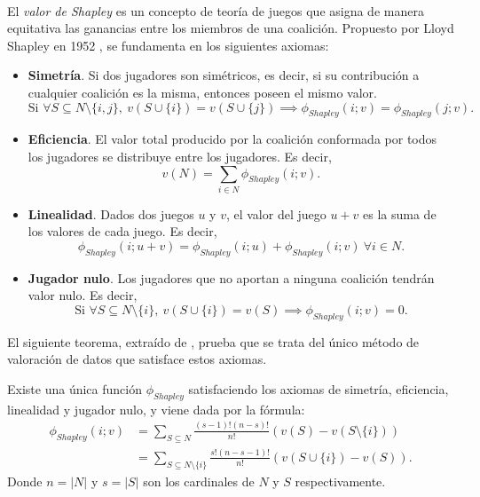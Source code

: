 \

El \emph{valor de Shapley}  es un concepto
de teoría de juegos que asigna de manera equitativa las ganancias
entre los miembros de una coalición. Propuesto
por Lloyd Shapley en 1952 \cite{shapleyValue},
se fundamenta en los siguientes axiomas:

\begin{itemize}
  \item \textbf{Simetría}. Si dos jugadores son simétricos, es decir,
  si su contribución a cualquier coalición es la misma,
  entonces poseen el mismo valor. 
  $$
  \text{Si } \forall S \subseteq N \setminus \{i, j\},\ 
  v(S \cup \{i\}) = v(S \cup \{j\}) \implies \phi_{Shapley}(i;v) =
  \phi_{Shapley}(j;v).
  $$

  \item \textbf{Eficiencia}. El valor total producido por la coalición
  conformada por todos los jugadores se distribuye entre los
  jugadores. Es decir, 
  $$
  v(N)=\sum_{i\in N}\phi_{Shapley}(i;v).
  $$

  \item \textbf{Linealidad}. Dados dos juegos $u$ y $v$, el valor del
  juego $u+v$ es la suma de los valores de cada juego. Es decir,
  \index{Linealidad}
  $$
  \phi_{Shapley}(i;u+v)=\phi_{Shapley}(i;u)+\phi_{Shapley}(i;v)\ \forall i \in N.
  $$

  \item \textbf{Jugador nulo}. Los jugadores que no aportan a ninguna
  coalición tendrán valor nulo. Es decir, \index{Jugador!nulo}
  $$
  \text{Si } \forall S \subseteq N \setminus \{i\},\ 
  v(S \cup \{i\}) = v(S) \implies \phi_{Shapley}(i;v) = 0.
  $$
\end{itemize}

El siguiente teorema, extraído de \cite{shapleyValue}, prueba
que se trata del único método de valoración de datos que satisface
estos axiomas.

\begin{theorem}
  Existe una única función $\phi_{Shapley}$ 
  satisfaciendo los axiomas de simetría, eficiencia, linealidad y
  jugador nulo, y viene dada por la fórmula:
  \begin{align*}
    \phi_{Shapley}(i;v)&=\sum_{S\subseteq N}
    \frac{(s-1)!(n-s)!}{n!}(v(S)-v(S \setminus \{i\}))\\
    &= \sum_{S\subseteq N \setminus \{i\}} \frac{s!(n-s-1)!}
    {n!}(v(S\cup \{i\})-v(S)).
  \end{align*}
  Donde $n = |N|$ y $s = |S|$ son los cardinales de $N$ y $S$
  respectivamente.  
\end{theorem}

